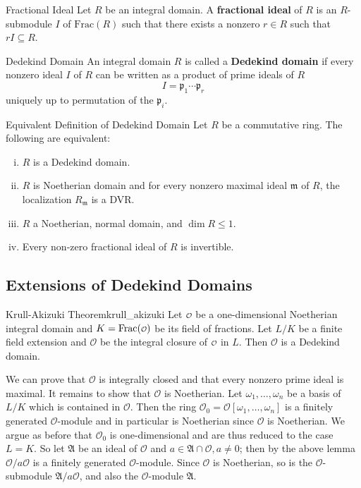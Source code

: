 \begin{definition}{Fractional Ideal}{}
    Let $R$ be an integral domain. A \textbf{fractional ideal} of $R$ is an $R$-submodule $I$ of $\mathrm{Frac}(R)$ such that there exists a nonzero $r\in R$ such that $rI\subseteq R$.
\end{definition}

\begin{definition}{Dedekind Domain}{}
    An integral domain $R$ is called a \textbf{Dedekind domain} if every nonzero ideal $I$ of $R$ can be written as a product of prime ideals of $R$
    \[
    I=\mathfrak{p}_1\cdots\mathfrak{p}_r
    \]
    uniquely up to permutation of the $\mathfrak{p}_i$.
\end{definition}

\begin{proposition}{Equivalent Definition of Dedekind Domain}{}
    Let $R$ be a commutative ring. The following are equivalent:
    \begin{enumerate}[(i)]
        \item $R$ is a Dedekind domain.
        \item $R$ is Noetherian domain and for every nonzero maximal ideal $\mathfrak{m}$ of $R$, the localization $R_{\mathfrak{m}}$ is a DVR.
        \item $R$ a Noetherian, normal domain, and $\dim R\le 1$.
        \item Every non-zero fractional ideal of $R$ is invertible.
    \end{enumerate}
    
\end{proposition}

\subsection{Extensions of Dedekind Domains}
\begin{theorem}{Krull-Akizuki Theorem}{krull_akizuki}
    Let $\mathcalo$ be a one-dimensional Noetherian
    integral domain and $K=\mathrm{Frac}(\mathcalo)$ be its field of fractions. Let $L/K$ be a finite field extension and $\mathcal{O}$ be the integral closure of $\mathcalo$ in $L$. Then $\mathcal{O}$ is a Dedekind domain.
\end{theorem}
\begin{prf}
    We can prove that $\mathcal{O}$ is integrally closed and that every nonzero prime ideal is maximal. It remains to show that $\mathcal{O}$ is Noetherian. Let $\omega_1, \ldots, \omega_n$ be a basis of $L/K$ which is contained in $\mathcal{O}$. Then the ring $\mathcal{O}_0=\mathcal{O}\left[\omega_1, \ldots, \omega_n\right]$ is a finitely generated $\mathcal{O}$-module and in particular is Noetherian since $\mathcal{O}$ is Noetherian. We argue as before that $\mathcal{O}_0$ is one-dimensional and are thus reduced to the case $L=K$. So let $\mathfrak{A}$ be an ideal of $\mathcal{O}$ and $a \in \mathfrak{A} \cap \mathcal{O}, a \neq 0$; then by the above lemma $\mathcal{O} / a \mathcal{O}$ is a finitely generated $\mathcal{O}$-module. Since $\mathcal{O}$ is Noetherian, so is the $\mathcal{O}$-submodule $\mathfrak{A} / a \mathcal{O}$, and also the $\mathcal{O}$-module $\mathfrak{A}$.
\end{prf}


